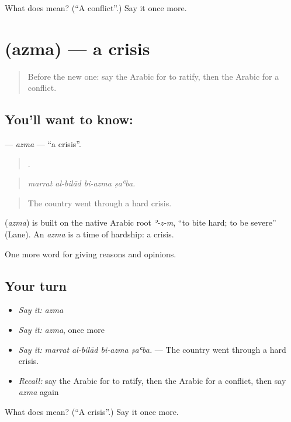 \begin{tcolorbox}[breakable,colback=teal!4,colframe=teal!35!black,title={Before you move on}]
What does  mean? (\textquotedblleft{}A conflict\textquotedblright{}.) Say it once more.
\end{tcolorbox}
\section[\texorpdfstring{\ar{أزمة} (azma)}{أزمة (azma)}]{ (azma) — a crisis}

\label{lesson:AR-C386-azma}



\begin{quote}
Before the new one: say the Arabic for to ratify, then the Arabic for a conflict.
\end{quote}

\subsection*{You'll want to know: }
\textbf{} — \emph{azma} — \textquotedblleft{}a crisis\textquotedblright{}.

\begin{quote}
   .
\end{quote}

\begin{quote}
\emph{marrat al-bilād bi-azma ṣaʿba.}
\end{quote}

\begin{quote}
The country went through a hard crisis.
\end{quote}

\begin{cousinweb}
\textbf{} (\emph{azma}) is built on the native Arabic root \emph{ʾ-z-m}, \textquotedblleft{}to bite hard; to be severe\textquotedblright{} (Lane). An \emph{azma} is a time of hardship: a crisis.
\end{cousinweb}

\begin{grammarlens}[title={What you've built}]
One more word for giving reasons and opinions.
\end{grammarlens}

\subsection*{Your turn}
\begin{itemize}
\raggedright
  \item \emph{Say it:} \emph{azma}
  \item \emph{Say it:} \emph{azma}, once more
  \item \emph{Say it:} \emph{marrat al-bilād bi-azma ṣaʿba.} — The country went through a hard crisis.
  \item \emph{Recall:} say the Arabic for to ratify, then the Arabic for a conflict, then say \emph{azma} again
\end{itemize}

\begin{tcolorbox}[breakable,colback=teal!4,colframe=teal!35!black,title={Before you move on}]
What does  mean? (\textquotedblleft{}A crisis\textquotedblright{}.) Say it once more.
\end{tcolorbox}
